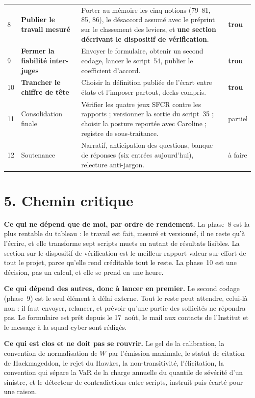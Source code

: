 \documentclass[11pt,a4paper]{article}
\newcommand{\partiel}{\cellcolor{softamber}partiel}
\newcommand{\trou}{\cellcolor{softred}\textbf{trou}}
\newcommand{\afaire}{à faire}
\begin{document}
\begin{center}
\begin{tabular}{@{}p{0.4cm} p{3.9cm} p{8.8cm} p{1.5cm}@{}}
8 & \textbf{Publier le travail mesuré} & Porter au mémoire les cinq notions (79--81, 85, 86), le
désaccord assumé avec le préprint sur le classement des leviers, et \textbf{une section
décrivant le dispositif de vérification}. & \trou \\

9 & \textbf{Fermer la fiabilité inter-juges} & Envoyer le formulaire, obtenir un second codage,
lancer le script~54, publier le coefficient d'accord. & \trou \\

10 & \textbf{Trancher le chiffre de tête} & Choisir la définition publiée de l'écart entre états
et l'imposer partout, decks compris. & \trou \\

11 & Consolidation finale & Vérifier les quatre jeux SFCR contre les rapports ; versionner la
sortie du script~35 ; choisir la posture reportée avec Caroline ; registre de sous-traitance. &
\partiel \\

12 & Soutenance & Narratif, anticipation des questions, banque de réponses (six entrées
aujourd'hui), relecture anti-jargon. & \afaire \\
\bottomrule
\end{tabular}
\end{center}

\section*{5. Chemin critique}

\textbf{Ce qui ne dépend que de moi, par ordre de rendement.} La phase~8 est la plus rentable du
tableau : le travail est fait, mesuré et versionné, il ne reste qu'à l'écrire, et elle
transforme sept scripts muets en autant de résultats lisibles. La section sur le dispositif de
vérification est le meilleur rapport valeur sur effort de tout le projet, parce qu'elle rend
créditable tout le reste. La phase~10 est une décision, pas un calcul, et elle se prend en une
heure.

\textbf{Ce qui dépend des autres, donc à lancer en premier.} Le second codage (phase~9) est le
seul élément à délai externe. Tout le reste peut attendre, celui-là non : il faut envoyer,
relancer, et prévoir qu'une partie des sollicités ne répondra pas. Le formulaire est prêt depuis
le 17~août, le mail aux contacts de l'Institut et le message à la squad cyber sont rédigés.

\textbf{Ce qui est clos et ne doit pas se rouvrir.} Le gel de la calibration, la convention de
normalisation de $W$ par l'émission maximale, le statut de citation de Hackmageddon, le rejet du
Hawkes, la non-transitivité, l'élicitation, la convention qui sépare la VaR de la charge annuelle
du quantile de sévérité d'un sinistre, et le détecteur de contradictions entre scripts, instruit
puis écarté pour une raison.
\end{document}
